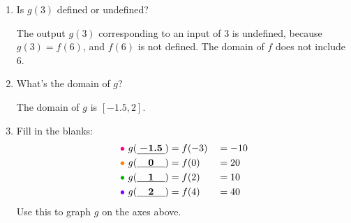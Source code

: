 \documentclass{article}
\begin{document}
\begin{enumerate}
  \begin{enumerate}
  \item
    \begin{problem}[0.25in]
      Is $g(3)$ defined or undefined?
    \end{problem}

    \begin{solution}
      The output $g(3)$ corresponding to an input of $3$ is undefined, because $g(3)=f(6)$, and
      $f(6)$ is not defined. The domain of $f$ does not include $6$.
    \end{solution}

  \item
    \begin{problem}[0.5in]
      What's the domain of $g$? 
    \end{problem}

    \begin{solution}
      The domain of $g$ is $[-1.5, 2]$.
    \end{solution}

  \item


    \begin{problem}[\newpage]
      Fill in the blanks:
      \begin{alignat*}{3}
        \solonly{\textcolor{hotpink}{\bullet\ }} g(\cfitb{0.4in}{-1.5}) &= f(-3) & &= -10 \\
        \solonly{\textcolor{orange}{\bullet\ }} g(\cfitb{0.4in}{0}) &= f(0) & &= 20 \\
        \solonly{\textcolor{green!70!black}{\bullet\ }} g(\cfitb{0.4in}{1}) &= f(2) & &= 10 \\
        \solonly{\textcolor{purple}{\bullet\ }} g(\cfitb{0.4in}{2}) &= f(4) & &= 40 
      \end{alignat*}
      Use this to graph $g$ on the axes above.
    \end{problem}


\end{enumerate}
\end{enumerate}
\end{document}
